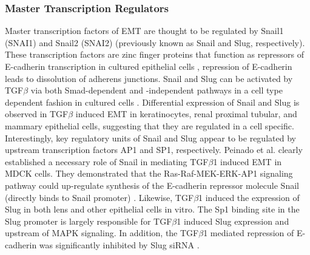 \subsubsection*{Master Transcription Regulators}
Master transcription factors of EMT are thought to be regulated by Snail1 (SNAI1) and Snail2 (SNAI2) (previously known as Snail and Slug, respectively).
These transcription factors are zinc finger proteins that function as repressors of E-cadherin transcription in cultured epithelial cells \cite{Cano:2000kh}, repression of E-cadherin leads to dissolution of adherens junctions.
Snail and Slug can be activated by TGF$\beta$ via both Smad-dependent and -independent pathways in a cell type dependent fashion in cultured cells \cite{Peinado2003}.
Differential expression of Snail and Slug is observed in TGF$\beta$ induced EMT in keratinocytes, renal proximal tubular, and mammary epithelial cells, suggesting that they are regulated in a cell specific.
Interestingly, key regulatory units of Snail and Slug appear to be regulated by upstream transcription factors AP1 and SP1, respectively.
Peinado et al. clearly established a necessary role of Snail in mediating TGF$\beta$1 induced EMT in MDCK cells.
They demonstrated that the Ras-Raf-MEK-ERK-AP1 signaling pathway could up-regulate synthesis of the E-cadherin repressor molecule Snail (directly binds to Snail promoter) \cite{Peinado:2004pt}.
Likewise, TGF$\beta$1 induced the expression of Slug in both lens and other epithelial cells in vitro.
The Sp1 binding site in the Slug promoter is largely responsible for TGF$\beta$1 induced Slug expression and upstream of MAPK signaling.
In addition, the TGF$\beta$1 mediated repression of E-cadherin was significantly inhibited by Slug siRNA \cite{Choi2007}.

